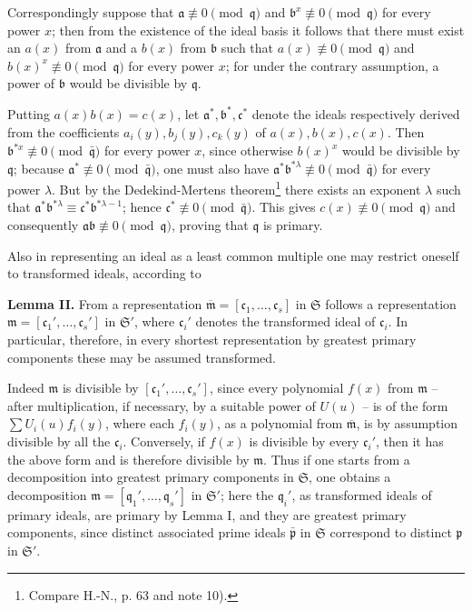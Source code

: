 \documentclass[11pt]{article}
\providecommand{\frakS}{\mathfrak S}
\providecommand{\frakm}{\mathfrak m}
\providecommand{\frakp}{\mathfrak p}
\providecommand{\frakq}{\mathfrak q}
\providecommand{\fraka}{\mathfrak a}
\providecommand{\frakb}{\mathfrak b}
\providecommand{\frakc}{\mathfrak c}
\providecommand{\frakb}{\mathfrak b}
\providecommand{\frakc}{\mathfrak c}
\providecommand{\barfrakm}{\overline{\mathfrak m}}
\begin{document}
Correspondingly suppose that $\fraka\not\equiv0\pmod{\frakq}$ and $\frakb^x\not\equiv0\pmod{\frakq}$ for every power $x$; then from the existence of the ideal basis it follows that there must exist an $a(x)$ from $\fraka$ and a $b(x)$ from $\frakb$ such that $a(x)\not\equiv0\pmod{\frakq}$ and $b(x)^x\not\equiv0\pmod{\frakq}$ for every power $x$; for under the contrary assumption, a power of $\frakb$ would be divisible by $\frakq$.

Putting $a(x)b(x)=c(x)$, let $\fraka^*,\frakb^*,\frakc^*$ denote the ideals respectively derived from the coefficients $a_i(y),b_j(y),c_k(y)$ of $a(x),b(x),c(x)$. Then $\frakb^{*x}\not\equiv0\pmod{\bar{\frakq}}$ for every power $x$, since otherwise $b(x)^x$ would be divisible by $\frakq$; because $\fraka^*\not\equiv0\pmod{\bar{\frakq}}$, one must also have $\fraka^*\frakb^{*\lambda}\not\equiv0\pmod{\bar{\frakq}}$ for every power $\lambda$. But by the Dedekind-Mertens theorem\footnote{Compare H.-N., p. 63 and note 10).} there exists an exponent $\lambda$ such that $\fraka^*\frakb^{*\lambda}\equiv \frakc^*\frakb^{*\lambda-1}$; hence $\frakc^*\not\equiv0\pmod{\bar{\frakq}}$. This gives $c(x)\not\equiv0\pmod{\frakq}$ and consequently $\fraka\frakb\not\equiv0\pmod{\frakq}$, proving that $\frakq$ is primary.

Also in representing an ideal as a least common multiple one may restrict oneself to transformed ideals, according to

\textbf{Lemma II.} From a representation $\barfrakm=[\frakc_1,\ldots,\frakc_s]$ in $\frakS$ follows a representation $\frakm=[\frakc_1',\ldots,\frakc_s']$ in $\frakS'$, where $\frakc_i'$ denotes the transformed ideal of $\frakc_i$. In particular, therefore, in every shortest representation by greatest primary components these may be assumed transformed.

Indeed $\frakm$ is divisible by $[\frakc_1',\ldots,\frakc_s']$, since every polynomial $f(x)$ from $\frakm$ -- after multiplication, if necessary, by a suitable power of $U(u)$ -- is of the form $\sum U_i(u)f_i(y)$, where each $f_i(y)$, as a polynomial from $\barfrakm$, is by assumption divisible by all the $\frakc_i$. Conversely, if $f(x)$ is divisible by every $\frakc_i'$, then it has the above form and is therefore divisible by $\frakm$. Thus if one starts from a decomposition into greatest primary components in $\frakS$, one obtains a decomposition $\frakm=[\frakq_1',\ldots,\frakq_s']$ in $\frakS'$; here the $\frakq_i'$, as transformed ideals of primary ideals, are primary by Lemma I, and they are greatest primary components, since distinct associated prime ideals $\bar{\frakp}$ in $\frakS$ correspond to distinct $\frakp$ in $\frakS'$.
\end{document}
